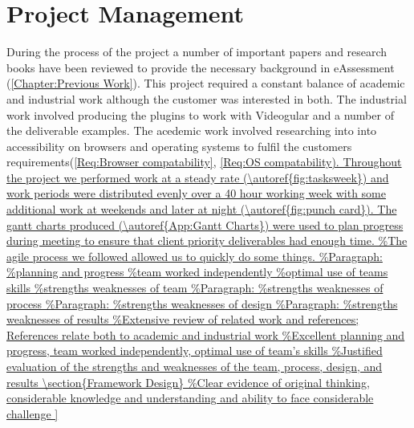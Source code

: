 \section{Project Management}

During the process of the project a number of important papers and research books have been reviewed to provide the necessary background in eAssessment (\autoref{Chapter:Previous Work}). This project required a constant balance of academic and industrial work although the customer was interested in both. The industrial work involved producing the plugins to work with Videogular and a number of the deliverable examples. The acedemic work involved researching into into accessibility on browsers and operating systems to fulfil the customers requirements(\cref{Req:Browser compatability}, \cref{Req:OS compatability).

Throughout the project we performed work at a steady rate (\autoref{fig:tasksweek}) and work periods were distributed evenly over a 40 hour working week with some additional work at weekends and later at night (\autoref{fig:punch card}). The gantt charts produced (\autoref{App:Gantt Charts}) were used to plan progress during meeting to ensure that client priority deliverables had enough time.










\section{Framework Design}


}
